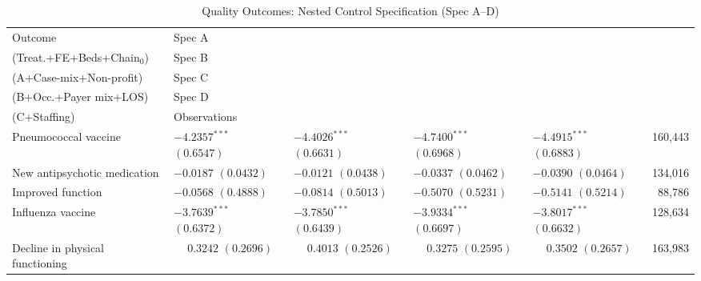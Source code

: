 \begin{table}[H]
\centering
\begin{threeparttable}
\caption{Quality Outcomes: Nested Control Specification (Spec A--D)}
\label{tab:nested-quality}
\small
\setlength{\tabcolsep}{6pt}
\begin{tabularx}{\textwidth}{@{} l Y Y Y Y r @{}}
\toprule
Outcome & Spec A\\(Treat.+FE+Beds+Chain$_{0}$) & Spec B\\(A+Case-mix+Non-profit) & Spec C\\(B+Occ.+Payer mix+LOS) & Spec D\\(C+Staffing) & Observations \\
\midrule
Pneumococcal vaccine &  &  &  &  & 160,443 \\
New antipsychotic medication &  &  &  &  & 134,016 \\
Improved function &  &  &  &  & 88,786 \\
Influenza vaccine &  &  &  &  & 128,634 \\
Decline in physical functioning &  &  &  &  & 163,983 \\

\end{tabularx}
\end{threeparttable}
\end{table}
